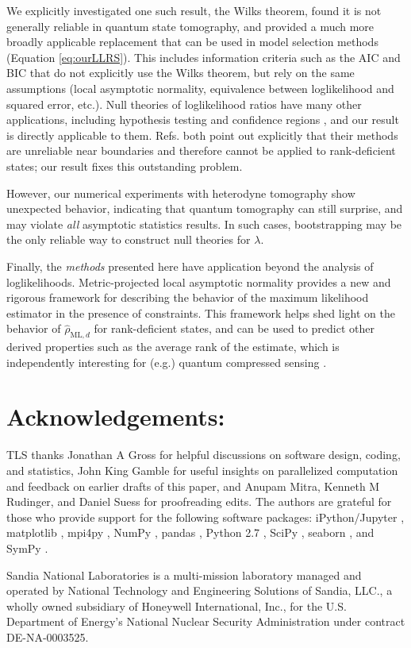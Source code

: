 \documentclass[aps,pra, twocolumn]{revtex4-1}
\newcommand{\rhohat}{\hat{\rho}}
\newcommand{\rhoML}[1]{\rhohat_{\scriptscriptstyle{\mathrm{ML},#1}}}
\begin{document}
We explicitly investigated one such result, the Wilks theorem, found it is not generally reliable in quantum state tomography, and provided  a much more broadly applicable replacement that can be used in model selection methods (Equation \eqref{eq:ourLLRS}).  This includes information criteria such as the AIC and BIC \cite{Akaike1974, Schwarz1978, Kass1995, Burnham2004} that do not explicitly use the Wilks theorem, but rely on the same assumptions (local asymptotic normality, equivalence between loglikelihood and squared error, etc.).  Null theories of loglikelihood ratios have many other applications, including hypothesis testing \cite{Blume-Kohout2010,Moroder2013} and confidence regions \cite{Glancy2012a}, and our result is directly applicable to them.  Refs. \cite{Moroder2013,Glancy2012a} both point out explicitly that their methods are unreliable near boundaries and therefore cannot be applied to rank-deficient states; our result fixes this outstanding problem.

However, our numerical experiments with heterodyne tomography show unexpected behavior, indicating that quantum tomography can still surprise, and may violate \emph{all} asymptotic statistics results.  In such cases, bootstrapping \cite{Efron1979, Higgins2004} may be the only reliable way to construct null theories for $\lambda$. 

Finally, the \emph{methods} presented here have application beyond the analysis of loglikelihoods.  Metric-projected local asymptotic normality provides a new and rigorous framework for describing the behavior of the maximum likelihood estimator in the presence of constraints. This framework helps shed light on the behavior of $\rhoML{d}$ for rank-deficient states, and can be used to predict other derived properties such as the average rank of the estimate, which is independently interesting for (e.g.) quantum compressed sensing \cite{Flammia2012a, Steffens2016, Kalev2015, Kalev2015a}.

\section{Acknowledgements:}
TLS thanks Jonathan A Gross for helpful discussions on software design, coding, and statistics, John King Gamble for useful insights on parallelized
computation and feedback on earlier drafts of this paper, and Anupam Mitra, Kenneth M Rudinger, and Daniel Suess for proofreading edits. The authors are grateful for those who provide support for the following software packages: iPython/Jupyter \cite{Perez}, matplotlib
\cite{Hunter2007}, mpi4py \cite{Dalcin2011},  NumPy \cite{VanDerWalt2011}, pandas \cite{mckinney2010}, Python 2.7 
\cite{vanRossum}, SciPy \cite{Oliphant2007a}, seaborn \cite{Waskom2016}, and SymPy \cite{Meurer2017}. 

Sandia National Laboratories is a multi-mission laboratory managed and operated by National Technology and Engineering Solutions of Sandia, LLC., a wholly owned subsidiary of Honeywell International, Inc., for the U.S. Department of Energy's National Nuclear Security Administration under contract DE-NA-0003525.



\end{document}
